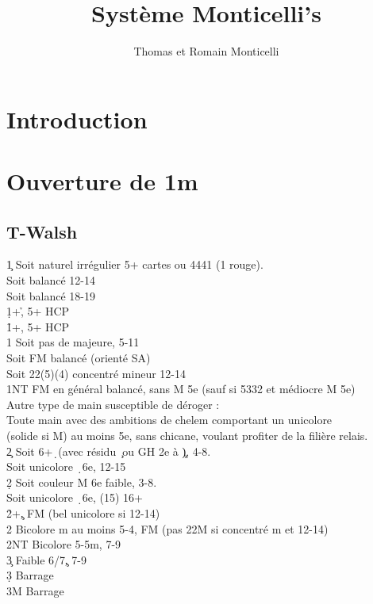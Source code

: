 \documentclass[a4paper]{article}
\title{Système Monticelli's}
\author{Thomas et Romain Monticelli}
\begin{document}
\maketitle
\tableofcontents

\section{Introduction}

\section{Ouverture de 1m}

\subsection{T-Walsh}

\begin{bidtable}
1\c \> Soit naturel irrégulier 5+ cartes ou 4441 (1 rouge).\+\\
Soit \> balancé 12-14\\
Soit \> balancé 18-19\\
1\d {}+\h , 5+ HCP\\
1\h {}+\s , 5+ HCP\\
1\s \> Soit pas de majeure, 5-11\\
\>Soit FM balancé (orienté SA)\\
\>Soit 22(5)(4) concentré mineur 12-14\\
1NT \> FM en général balancé, sans M 5e (sauf si 5332 et médiocre M 5e)\\
\>Autre type de main susceptible de déroger : \\
\>Toute main avec des ambitions de chelem comportant un unicolore \\
\>(solide si M) au moins 5e, sans chicane, voulant profiter de la filière relais.\\
2\c \> Soit 6+\d\ (avec résidu \c\ ou GH 2e à \c ), 4-8.\\
\>Soit unicolore \d\ 6e, 12-15\\
2\d \> Soit couleur M 6e faible, 3-8.\\
\>Soit unicolore \d\ 6e, (15) 16+\\
2\h {}+\c , FM (bel unicolore si 12-14)\\
2\s \> Bicolore m au moins 5-4, FM (pas 22M si concentré m et 12-14)\\
2NT \> Bicolore 5-5m, 7-9\\
3\c \> Faible 6/7\c , 7-9\\
3\d \> Barrage\\
3M \> Barrage\-
\end{bidtable}
\end{document}
